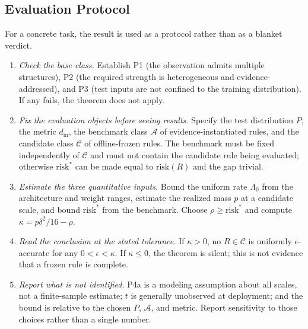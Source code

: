 \documentclass[twoside,11pt]{article}
\begin{document}
\subsection{Evaluation Protocol}
\label{sec:protocol}%

For a concrete task, the result is used as a protocol rather than as a blanket verdict.

\begin{enumerate}
\item \emph{Check the base class.} Establish P1 (the observation admits multiple structures), P2 (the required strength is heterogeneous and evidence-addressed), and P3 (test inputs are not confined to the training distribution). If any fails, the theorem does not apply.
\item \emph{Fix the evaluation objects before seeing results.} Specify the test distribution $P$, the metric $d_{\mathrm{in}}$, the benchmark class $\mathcal{A}$ of evidence-instantiated rules, and the candidate class $\mathcal{C}$ of offline-frozen rules. The benchmark must be fixed independently of $\mathcal{C}$ and must not contain the candidate rule being evaluated; otherwise $\mathrm{risk}^*$ can be made equal to $\mathrm{risk}(R)$ and the gap trivial.
\item \emph{Estimate the three quantitative inputs.} Bound the uniform rate $\Lambda_0$ from the architecture and weight ranges, estimate the realized mass $p$ at a candidate scale, and bound $\mathrm{risk}^*$ from the benchmark. Choose $\rho\ge\mathrm{risk}^*$ and compute $\kappa=p\delta^2/16-\rho$.
\item \emph{Read the conclusion at the stated tolerance.} If $\kappa>0$, no $R\in\mathcal{C}$ is uniformly $\epsilon$-accurate for any $0<\epsilon<\kappa$. If $\kappa\le0$, the theorem is silent; this is not evidence that a frozen rule is complete.
\item \emph{Report what is not identified.} P4a is a modeling assumption about all scales, not a finite-sample estimate; $t$ is generally unobserved at deployment; and the bound is relative to the chosen $P$, $\mathcal{A}$, and metric. Report sensitivity to those choices rather than a single number.
\end{enumerate}
\end{document}
